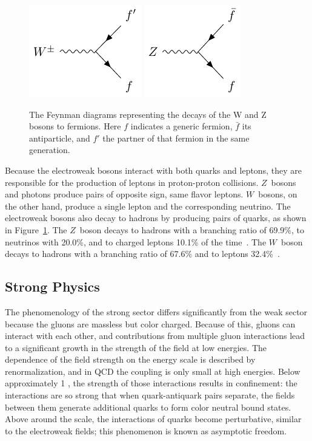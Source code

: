 \begin{figure}
\includegraphics[width=\halffig]{figures/feyn_wdecay.pdf}
\includegraphics[width=\halffig]{figures/feyn_zdecay.pdf}\\
\caption{The Feynman diagrams representing the decays of the W and Z bosons to fermions. Here $f$ indicates a generic fermion, $\bar{f}$ its antiparticle, and $f'$ the partner of that fermion in the same generation.}
\label{fig:feyn_weak}
\end{figure}

Because the electroweak bosons interact with both quarks and leptons, they are responsible for the production of leptons in proton-proton collisions.
$Z$~bosons and photons produce pairs of opposite sign, same flavor leptons.
$W$~bosons, on the other hand, produce a single lepton and the corresponding neutrino.
The electroweak bosons also decay to hadrons by producing pairs of quarks, as shown in Figure~\ref{fig:feyn_weak}.
The $Z$~boson decays to hadrons with a branching ratio of 69.9\%, to neutrinos with 20.0\%, and to charged leptons 10.1\% of the time~\cite{pdg}.
The $W$~boson decays to hadrons with a branching ratio of 67.6\% and to leptons 32.4\%~\cite{pdg}.

\subsection{Strong Physics}
\label{sec:strong}

The phenomenology of the strong sector differs significantly from the weak sector because the gluons are massless but color charged.
Because of this, gluons can interact with each other, and contributions from multiple gluon interactions lead to a significant growth in the strength of the field at low energies.
The dependence of the field strength on the energy scale is described by renormalization, and in \ac{QCD} the coupling is only small at high energies.
Below approximately 1 \GeV, the strength of those interactions results in confinement: the interactions are so strong that when quark-antiquark pairs separate, the fields between them generate additional quarks to form color neutral bound states. 
Above around the \GeV scale, the interactions of quarks become perturbative, similar to the electroweak fields; this phenomenon is known as asymptotic freedom.

